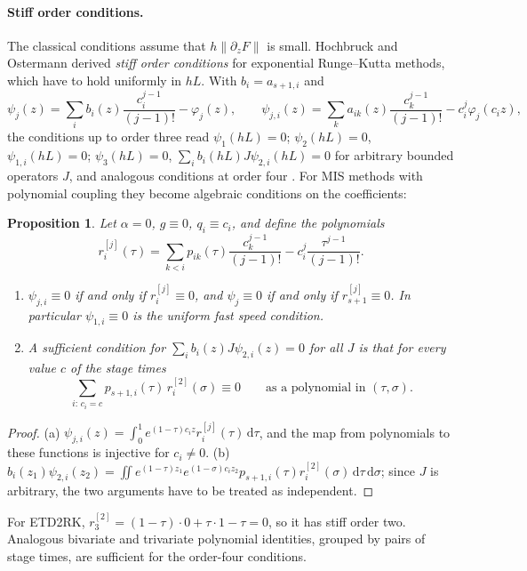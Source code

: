 \documentclass[11pt,a4paper]{article}
\newtheorem{proposition}[theorem]{Proposition}
\theoremstyle{definition}
\theoremstyle{remark}
\newcommand{\dd}{\,\mathrm{d}}
\begin{document}
\paragraph{Stiff order conditions.}
The classical conditions assume that $h\|\partial_zF\|$ is small. Hochbruck and Ostermann
\cite{HochbruckOstermann2005,HochbruckOstermann2010} derived \emph{stiff order conditions} for exponential Runge--Kutta
methods, which have to hold uniformly in $hL$. With $b_i=a_{s+1,i}$ and
\[
 \psi_j(z)=\sum_ib_i(z)\frac{c_i^{j-1}}{(j-1)!}-\varphi_j(z),\qquad
 \psi_{j,i}(z)=\sum_ka_{ik}(z)\frac{c_k^{j-1}}{(j-1)!}-c_i^j\varphi_j(c_iz),
\]
the conditions up to order three read $\psi_1(hL)=0$; $\psi_2(hL)=0$, $\psi_{1,i}(hL)=0$; $\psi_3(hL)=0$,
$\sum_ib_i(hL)J\psi_{2,i}(hL)=0$ for arbitrary bounded operators $J$, and analogous conditions at order four
\cite{HochbruckOstermann2005}. For MIS methods with polynomial coupling they become algebraic conditions on the
coefficients:

\begin{proposition}\label{prop:stiff}
Let $\alpha=0$, $g\equiv0$, $q_i\equiv c_i$, and define the polynomials
\[
 r_i^{[j]}(\tau)=\sum_{k<i}p_{ik}(\tau)\frac{c_k^{j-1}}{(j-1)!}-c_i^j\frac{\tau^{j-1}}{(j-1)!} .
\]
\begin{enumerate}[label=(\alph*)]
\item $\psi_{j,i}\equiv0$ if and only if $r_i^{[j]}\equiv0$, and $\psi_j\equiv0$ if and only if $r_{s+1}^{[j]}\equiv0$.
  In particular $\psi_{1,i}\equiv0$ is the uniform fast speed condition.
\item A sufficient condition for $\sum_ib_i(z)J\psi_{2,i}(z)=0$ for all $J$ is that for every value $c$ of the stage times
  \[
   \sum_{i:\,c_i=c}p_{s+1,i}(\tau)\,r_i^{[2]}(\sigma)\equiv0\qquad\text{as a polynomial in }(\tau,\sigma).
  \]
\end{enumerate}
\end{proposition}

\begin{proof}
(a) $\psi_{j,i}(z)=\int_0^1e^{(1-\tau)c_iz}r_i^{[j]}(\tau)\dd\tau$, and the map from polynomials to these functions is
injective for $c_i\ne0$. (b) $b_i(z_1)\psi_{2,i}(z_2)=\iint e^{(1-\tau)z_1}e^{(1-\sigma)c_iz_2}p_{s+1,i}(\tau)r_i^{[2]}(\sigma)\dd\tau\dd\sigma$;
since $J$ is arbitrary, the two arguments have to be treated as independent.
\end{proof}

For ETD2RK, $r_3^{[2]}=(1-\tau)\cdot0+\tau\cdot1-\tau=0$, so it has stiff order two. Analogous bivariate and trivariate
polynomial identities, grouped by pairs of stage times, are sufficient for the order-four conditions.
\end{document}
